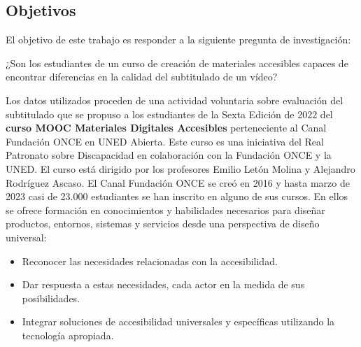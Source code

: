 \documentclass[
  letterpaper,
  DIV=11,
  numbers=noendperiod]{scrartcl}
\providecommand{\tightlist}{%
  \setlength{\itemsep}{0pt}\setlength{\parskip}{0pt}}\usepackage{longtable,booktabs,array}
\begin{document}
\hypertarget{sec-objetivos}{%
\subsection{Objetivos}\label{sec-objetivos}}

El objetivo de este trabajo es responder a la siguiente pregunta de
investigación:

\begin{tcolorbox}[enhanced jigsaw, leftrule=.75mm, bottomtitle=1mm, toprule=.15mm, opacityback=0, bottomrule=.15mm, colframe=quarto-callout-note-color-frame, titlerule=0mm, colbacktitle=quarto-callout-note-color!10!white, arc=.35mm, breakable, toptitle=1mm, left=2mm, colback=white, coltitle=black, title=\textcolor{quarto-callout-note-color}{\faInfo}\hspace{0.5em}{Pregunta de investigación}, rightrule=.15mm, opacitybacktitle=0.6]

¿Son los estudiantes de un curso de creación de materiales accesibles
capaces de encontrar diferencias en la calidad del subtitulado de un
vídeo?

\end{tcolorbox}

Los datos utilizados proceden de una actividad voluntaria sobre
evaluación del subtitulado que se propuso a los estudiantes de la Sexta
Edición de 2022 del \textbf{curso MOOC Materiales Digitales Accesibles}
perteneciente al Canal Fundación ONCE en UNED Abierta. Este curso es una
iniciativa del Real Patronato sobre Discapacidad en colaboración con la
Fundación ONCE y la UNED. El curso está dirigido por los profesores
Emilio Letón Molina y Alejandro Rodríguez Ascaso. El Canal Fundación
ONCE se creó en 2016 y hasta marzo de 2023 casi de 23.000 estudiantes se
han inscrito en alguno de sus cursos. En ellos se ofrece formación en
conocimientos y habilidades necesarios para diseñar productos, entornos,
sistemas y servicios desde una perspectiva de diseño universal:

\begin{itemize}
\tightlist
\item
  Reconocer las necesidades relacionadas con la accesibilidad.
\item
  Dar respuesta a estas necesidades, cada actor en la medida de sus
  posibilidades.
\item
  Integrar soluciones de accesibilidad universales y específicas
  utilizando la tecnología apropiada.
\end{itemize}
\end{document}
